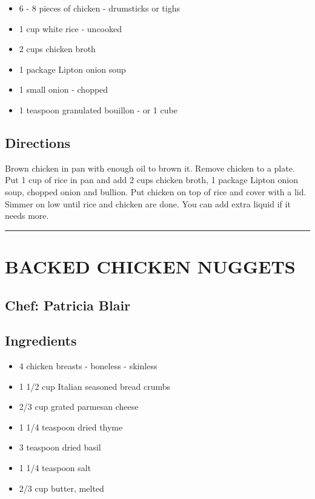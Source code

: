 \documentclass[
]{book}
\providecommand{\tightlist}{%
  \setlength{\itemsep}{0pt}\setlength{\parskip}{0pt}}
\begin{document}
\begin{itemize}
\tightlist
\item
  6 - 8 pieces of chicken - drumsticks or tighs
\item
  1 cup white rice - uncooked
\item
  2 cups chicken broth
\item
  1 package Lipton onion soup
\item
  1 small onion - chopped
\item
  1 teaspoon granulated bouillon - or 1 cube
\end{itemize}

\hypertarget{directions-41}{%
\subsection*{Directions}\label{directions-41}}


Brown chicken in pan with enough oil to brown it. Remove chicken to a plate.
Put 1 cup of rice in pan and add 2 cups chicken broth, 1 package Lipton onion soup,
chopped onion and bullion. Put chicken on top of rice and cover with a lid. Simmer
on low until rice and chicken are done. You can add extra liquid if it needs more.

\begin{center}\rule{0.5\linewidth}{0.5pt}\end{center}

\hypertarget{backed-chicken-nuggets}{%
\section*{BACKED CHICKEN NUGGETS}\label{backed-chicken-nuggets}}


\hypertarget{chef-patricia-blair-9}{%
\subsection*{Chef: Patricia Blair}\label{chef-patricia-blair-9}}


\hypertarget{ingredients-42}{%
\subsection*{Ingredients}\label{ingredients-42}}


\begin{itemize}
\tightlist
\item
  4 chicken breasts - boneless - skinless
\item
  1 1/2 cup Italian seasoned bread crumbs
\item
  2/3 cup grated parmesan cheese
\item
  1 1/4 teaspoon dried thyme
\item
  3 teaspoon dried basil
\item
  1 1/4 teaspoon salt
\item
  2/3 cup butter, melted
\end{itemize}
\end{document}
